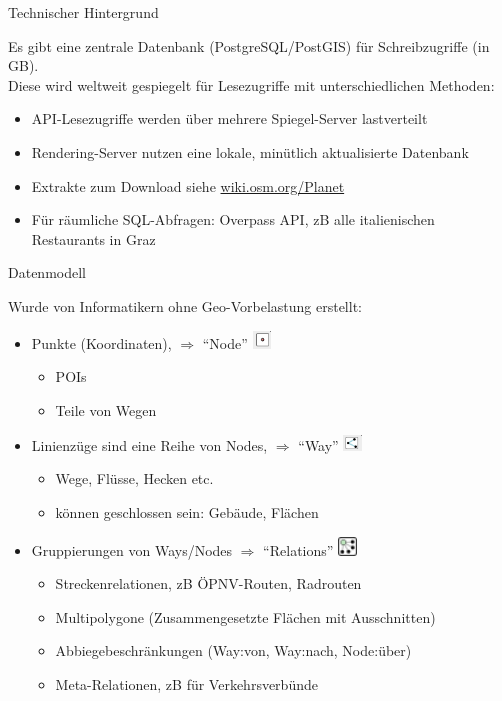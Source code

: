 \documentclass{beamer}
\begin{document}
    
\begin{frame}{Technischer Hintergrund}

Es gibt eine zentrale Datenbank (PostgreSQL/PostGIS) für Schreibzugriffe (in GB).\\
\pause
Diese wird weltweit gespiegelt für Lesezugriffe mit unterschiedlichen Methoden:

\begin{itemize}
  \item API-Lesezugriffe werden über mehrere Spiegel-Server lastverteilt
  \item Rendering-Server nutzen eine lokale, minütlich aktualisierte Datenbank
  \item Extrakte zum Download siehe \href{http://wiki.osm.org/Planet}{wiki.osm.org/Planet}
  \item Für räumliche SQL-Abfragen: Overpass API, zB alle italienischen Restaurants in Graz
\end{itemize}

\end{frame}

\begin{frame}{Datenmodell}

Wurde von Informatikern ohne Geo-Vorbelastung erstellt:
\begin{itemize}
  \item Punkte (Koordinaten), $\Rightarrow$ ``Node'' \includegraphics[width=0.5cm]{node.png}
	\begin{itemize}
          \item POIs
\pause
\item Teile von Wegen
\end{itemize}
  \item Linienzüge sind eine Reihe von Nodes, $\Rightarrow$ ``Way'' \includegraphics[width=0.5cm]{way.png}
	\begin{itemize}
	  \item Wege, Flüsse, Hecken etc.
	\item können geschlossen sein: Gebäude, Flächen
\end{itemize}
\pause
  \item Gruppierungen von Ways/Nodes $\Rightarrow$ ``Relations'' \includegraphics[width=0.5cm]{relation.png}
	\begin{itemize}
          \item Streckenrelationen, zB ÖPNV-Routen, Radrouten
	\item Multipolygone (Zusammengesetzte Flächen mit Ausschnitten)
	\item Abbiegebeschränkungen (Way:von, Way:nach, Node:über)
	\item Meta-Relationen, zB für Verkehrsverbünde
	\end{itemize}
\end{itemize}

\end{frame}
\end{document}
